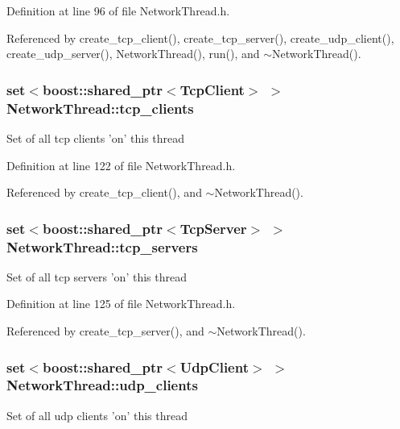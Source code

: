 Definition at line 96 of file NetworkThread.h.



Referenced by create\_\-tcp\_\-client(), create\_\-tcp\_\-server(), create\_\-udp\_\-client(), create\_\-udp\_\-server(), NetworkThread(), run(), and $\sim$NetworkThread().

\hypertarget{classNetworkThread_af502746d9b95956a36cadba40a8a1f36}{
\subsubsection[{tcp\_\-clients}]{\setlength{\rightskip}{0pt plus 5cm}set$<$boost::shared\_\-ptr$<${\bf TcpClient}$>$ $>$ {\bf NetworkThread::tcp\_\-clients}}}
\label{classNetworkThread_af502746d9b95956a36cadba40a8a1f36}
Set of all tcp clients 'on' this thread 

Definition at line 122 of file NetworkThread.h.



Referenced by create\_\-tcp\_\-client(), and $\sim$NetworkThread().

\hypertarget{classNetworkThread_a7948c2fc23492ed42115bd710a8889a1}{
\subsubsection[{tcp\_\-servers}]{\setlength{\rightskip}{0pt plus 5cm}set$<$boost::shared\_\-ptr$<${\bf TcpServer}$>$ $>$ {\bf NetworkThread::tcp\_\-servers}}}
\label{classNetworkThread_a7948c2fc23492ed42115bd710a8889a1}
Set of all tcp servers 'on' this thread 

Definition at line 125 of file NetworkThread.h.



Referenced by create\_\-tcp\_\-server(), and $\sim$NetworkThread().

\hypertarget{classNetworkThread_a5763ee354a9fff9e8b5f56961b1c3f92}{
\subsubsection[{udp\_\-clients}]{\setlength{\rightskip}{0pt plus 5cm}set$<$boost::shared\_\-ptr$<${\bf UdpClient}$>$ $>$ {\bf NetworkThread::udp\_\-clients}}}
\label{classNetworkThread_a5763ee354a9fff9e8b5f56961b1c3f92}
Set of all udp clients 'on' this thread 

